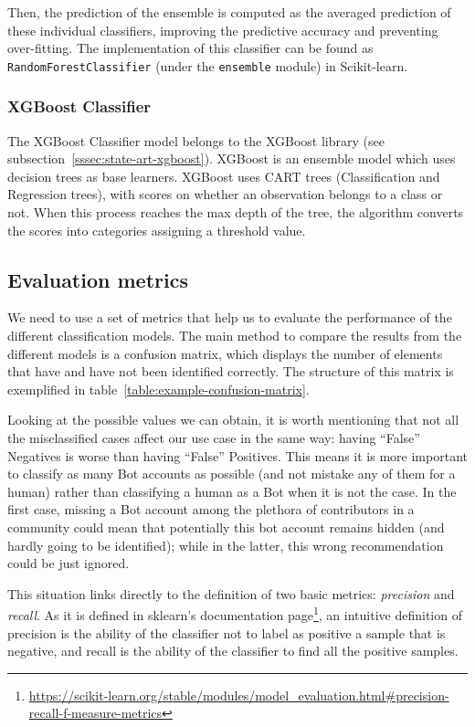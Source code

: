\documentclass[a4paper, 12pt]{book}
\begin{document}
Then, the prediction of the ensemble is computed as the averaged prediction of these individual 
classifiers, improving the predictive accuracy and preventing over-fitting. The implementation of this 
classifier can be found as \texttt{RandomForestClassifier} (under the \texttt{ensemble} module) 
in Scikit-learn.

\subsubsection{XGBoost Classifier}
\label{sssec:xgboost-classifier}

The XGBoost Classifier model belongs to the XGBoost library (see subsection~\ref{sssec:state-art-xgboost}). XGBoost is an ensemble model which uses decision trees as base learners. XGBoost uses CART trees (Classification and Regression trees), with scores on whether an observation belongs to a class or not. When this process reaches the max depth of the tree, the algorithm converts the scores into categories assigning a threshold value.

\subsection{Evaluation metrics}
\label{ssec:evaluation-metrics}

We need to use a set of metrics that help us to evaluate the performance of the different classification models. The main method to compare the results from the different models is a confusion matrix, which displays the number of elements that have and have not been identified correctly. The structure of this matrix is exemplified in table~\ref{table:example-confusion-matrix}.

Looking at the possible values we can obtain, it is worth mentioning that not all the misclassified cases affect our use case in the same way: having ``False'' Negatives is worse than having ``False'' Positives. This means it is more important to classify as many Bot accounts as possible (and not mistake any of them for a human) rather than classifying a human as a Bot when it is not the case. In the first case, missing a Bot account among the plethora of contributors in a community could mean that potentially this bot account remains hidden (and hardly going to be identified); while in the latter, this wrong recommendation could be just ignored.

This situation links directly to the definition of two basic metrics: \emph{precision} and \emph{recall}. As it is defined in sklearn's documentation page\footnote{\url{https://scikit-learn.org/stable/modules/model_evaluation.html\#precision-recall-f-measure-metrics}}, an intuitive definition of precision is the ability of the classifier not to label as positive a sample that is negative, and recall is the ability of the classifier to find all the positive samples.
\end{document}
